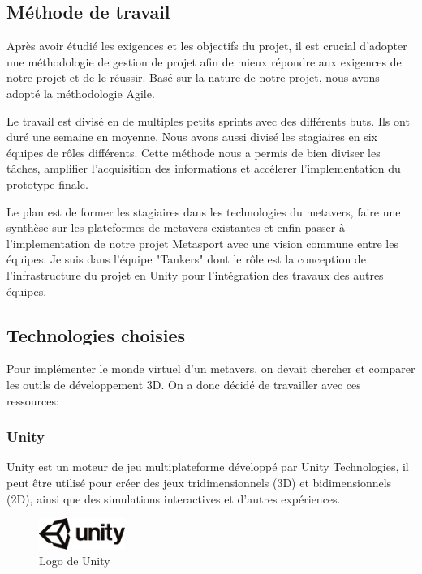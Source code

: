 \documentclass[12pt,a4paper,oneside,french]{book}
\begin{document}
\subsection{Méthode de travail}
Après avoir étudié les exigences et les objectifs du projet, il est crucial d’adopter une méthodologie de gestion de projet afin de mieux répondre aux exigences de notre projet et de le réussir.
Basé sur la nature de notre projet, nous avons adopté la méthodologie Agile.

\noindent
Le travail est divisé en de multiples petits sprints avec des différents buts. Ils ont duré une semaine en moyenne. Nous avons aussi divisé les stagiaires en six équipes de rôles différents. Cette méthode nous a permis de bien diviser les tâches, amplifier l'acquisition des informations et accélerer l'implementation du prototype finale.

\noindent
Le plan est de former les stagiaires dans les technologies du metavers, faire une synthèse sur les plateformes de metavers existantes et enfin passer à l'implementation de notre projet Metasport avec une vision commune entre les équipes. Je suis dans l'équipe "Tankers" dont le rôle est la conception de l'infrastructure du projet en Unity pour l'intégration des travaux des autres équipes.

\subsection{Technologies choisies}
Pour implémenter le monde virtuel d'un metavers, on devait chercher et comparer les outils de développement 3D. On a donc décidé de travailler avec ces ressources:

\subsubsection*{Unity}
Unity \cite{unity} est un moteur de jeu multiplateforme développé par Unity Technologies, il peut être utilisé pour créer
des jeux tridimensionnels (3D) et bidimensionnels (2D), ainsi que des simulations interactives et
d'autres expériences.
\begin{figure}[H]
    \centering
    \includegraphics[width=0.25\textwidth]{figure/unity.png}
    \caption{Logo de Unity}
    \label{fig:unity}
\end{figure}
\noindent
\end{document}
